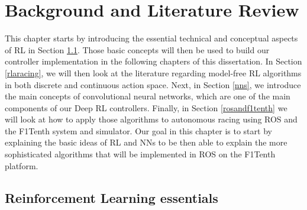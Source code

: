 
\chapter{Background and Literature Review} %

\label{Chapter2} %



This chapter starts by introducing the essential technical and conceptual aspects of RL in Section \ref{back}. Those basic concepts will then be used to build our controller implementation in the following chapters of this dissertation. In Section \ref{rlaracing}, we will then look at the literature regarding model-free RL algorithms in both discrete and continuous action space. Next, in Section \ref{nns}, we introduce the main concepts of convolutional neural networks, which are one of the main components of our Deep RL controllers. Finally, in Section \ref{rosandf1tenth} we will look at how to apply those algorithms to autonomous racing using ROS and the F1Tenth system and simulator. \newline
Our goal in this chapter is to start by explaining the basic ideas of RL and NNs to be then able to explain the more sophisticated algorithms that will be implemented in ROS on the F1Tenth platform. \newline

\section{Reinforcement Learning essentials}
\label{back}
